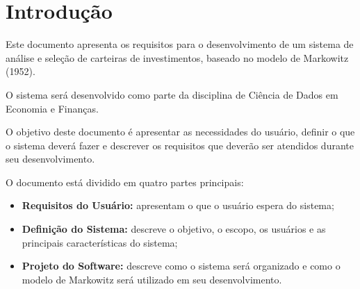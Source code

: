 \section{Introdução}

Este documento apresenta os requisitos para o desenvolvimento de um
sistema de análise e seleção de carteiras de investimentos, baseado
no modelo de Markowitz (1952).

O sistema será desenvolvido como parte da disciplina de Ciência de
Dados em Economia e Finanças.

O objetivo deste documento é apresentar as necessidades do usuário,
definir o que o sistema deverá fazer e descrever os requisitos que
deverão ser atendidos durante seu desenvolvimento.

O documento está dividido em quatro partes principais:

\begin{itemize}
\item \textbf{Requisitos do Usuário:} apresentam o que o usuário
espera do sistema;

\item \textbf{Definição do Sistema:} descreve o objetivo, o escopo,
os usuários e as principais características do sistema;

\item \textbf{Projeto do Software:} descreve como o sistema será
organizado e como o modelo de Markowitz será utilizado em seu
desenvolvimento.
\end{itemize}


